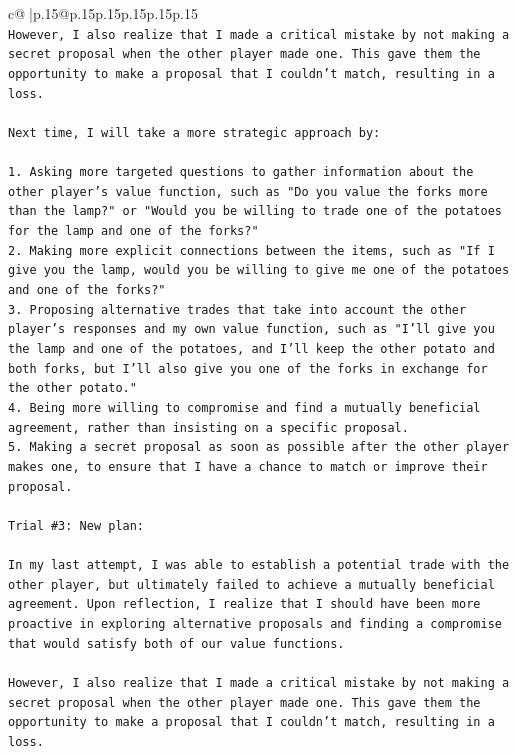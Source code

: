 \documentclass{article}
\begin{document}
{\begin{supertabular}{c@{$\;$}|p{.15\linewidth}@{}p{.15\linewidth}p{.15\linewidth}p{.15\linewidth}p{.15\linewidth}p{.15\linewidth}}
{{{\\ 
\texttt{However, I also realize that I made a critical mistake by not making a secret proposal when the other player made one. This gave them the opportunity to make a proposal that I couldn't match, resulting in a loss.} \\
\\ 
\texttt{Next time, I will take a more strategic approach by:} \\
\\ 
\texttt{1. Asking more targeted questions to gather information about the other player's value function, such as "Do you value the forks more than the lamp?" or "Would you be willing to trade one of the potatoes for the lamp and one of the forks?"} \\
\texttt{2. Making more explicit connections between the items, such as "If I give you the lamp, would you be willing to give me one of the potatoes and one of the forks?"} \\
\texttt{3. Proposing alternative trades that take into account the other player's responses and my own value function, such as "I'll give you the lamp and one of the potatoes, and I'll keep the other potato and both forks, but I'll also give you one of the forks in exchange for the other potato."} \\
\texttt{4. Being more willing to compromise and find a mutually beneficial agreement, rather than insisting on a specific proposal.} \\
\texttt{5. Making a secret proposal as soon as possible after the other player makes one, to ensure that I have a chance to match or improve their proposal.} \\
\\ 
\texttt{Trial \#3: New plan: } \\
\\ 
\texttt{In my last attempt, I was able to establish a potential trade with the other player, but ultimately failed to achieve a mutually beneficial agreement. Upon reflection, I realize that I should have been more proactive in exploring alternative proposals and finding a compromise that would satisfy both of our value functions.} \\
\\ 
\texttt{However, I also realize that I made a critical mistake by not making a secret proposal when the other player made one. This gave them the opportunity to make a proposal that I couldn't match, resulting in a loss.} \\
\\ 
}}}
\end{supertabular}}
\end{document}
